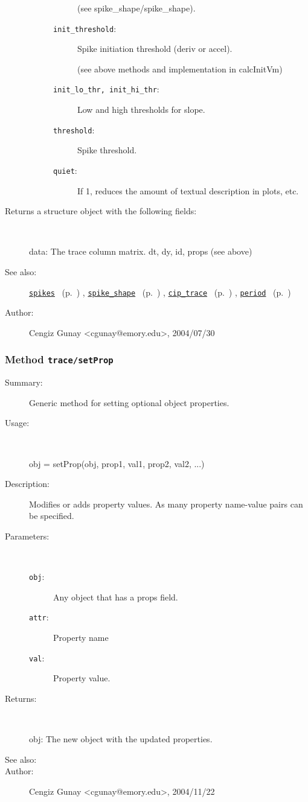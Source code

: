 \begin{description}
\begin{description}
\begin{description}
(see spike\_shape/spike\_shape).\item[\texttt{init\_threshold}:]
 Spike initiation threshold (deriv or accel).

(see above methods and implementation in calcInitVm)\item[\texttt{init\_lo\_thr, init\_hi\_thr}:]
 Low and high thresholds for slope.
\item[\texttt{threshold}:]
 Spike threshold.
\item[\texttt{quiet}:]
 If 1, reduces the amount of textual description in plots, etc.
\end{description}%
\end{description}%
%
\item[Returns a structure object with the following fields:]~

	data: The trace column matrix.
	dt, dy, id, props (see above)
%
%
\item[See also:]%
\hyperlink{ref_spikes}{\texttt{spikes}}%
\ (p.~\pageref{ref_spikes})%
%
, \hyperlink{ref_spike_shape}{\texttt{spike\_shape}}%
\ (p.~\pageref{ref_spike_shape})%
%
, \hyperlink{ref_cip_trace}{\texttt{cip\_trace}}%
\ (p.~\pageref{ref_cip_trace})%
%
, \hyperlink{ref_period}{\texttt{period}}%
\ (p.~\pageref{ref_period})%
%
%
\item[Author:]%
Cengiz Gunay <cgunay@emory.edu>, 2004/07/30%
\end{description}
\methodline%
\subsubsection[Method \texttt{setProp}]{Method \texttt{trace/setProp}}%
%
\label{ref_trace__setProp}%
\hypertarget{ref_trace__setProp}{}%
\begin{description}
\item[Summary:]Generic method for setting optional object properties.
%
\item[Usage:]~%
\begin{lyxcode}%
obj = setProp(obj, prop1, val1, prop2, val2, ...)
%
\end{lyxcode}%
%
\item[Description:]%
Modifies or adds property values. As many property name-value 
 pairs can be specified.
\item[Parameters:]~
\begin{description}%
\item[\texttt{obj}:]
 Any object that has a props field.
\item[\texttt{attr}:]
 Property name
\item[\texttt{val}:]
 Property value.
\end{description}%
%
\item[Returns:]~

	obj: The new object with the updated properties.
%
%
\item[See also:]%
%
\item[Author:]%
Cengiz Gunay <cgunay@emory.edu>, 2004/11/22%
\end{description}
\methodline%
